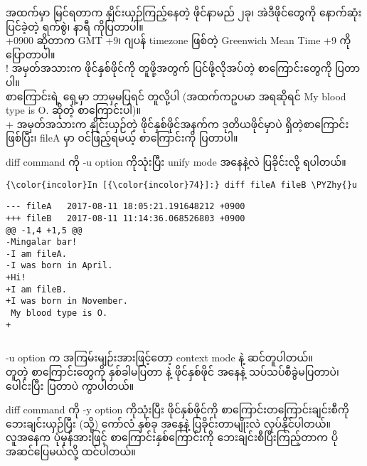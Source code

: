 \documentclass[11pt]{article}
\def\PYZhy{\char`\-}
\begin{document}
    \begin{Verbatim}[commandchars=\\\{\}]

    \end{Verbatim}

    အထက်မှာ မြင်ရတာက နှိုင်းယှဉ်ကြည့်နေတဲ့ ဖိုင်နာမည် ၂ခု၊ အဲဒီဖိုင်တွေကို
နောက်ဆုံး ပြင်ခဲ့တဲ့ ရက်စွဲ၊ နာရီ ကိုပြတာပါ။\\
+0900 ဆိုတာက GMT +9၊ ဂျပန် timezone ဖြစ်တဲ့ Greenwich Mean Time +9
ကိုပြောတာပါ။\\
! အမှတ်အသားက ဖိုင်နှစ်ဖိုင်ကို တူဖို့အတွက် ပြင်ဖို့လိုအပ်တဲ့
စာကြောင်းတွေကို ပြတာပါ။\\
စာကြောင်းရဲ့ ရှေ့မှာ ဘာမှမပြရင် တူလို့ပါ (အထက်ကဥပမာ အရဆိုရင် My blood
type is O. ဆိုတဲ့ စာကြောင်းပါ)။\\
+ အမှတ်အသားက နှိုင်းယှဉ်တဲ့ ဖိုင်နှစ်ဖိုင်အနက်က ဒုတိယဖိုင်မှာပဲ
ရှိတဲ့စာကြောင်းဖြစ်ပြီး၊ fileA မှာ ဝင်ဖြည့်ရမယ့် စာကြောင်းကို ပြတာပါ။

diff command ကို -u option ကိုသုံးပြီး unify mode အနေနဲ့လဲ ပြခိုင်းလို့
ရပါတယ်။

    \begin{Verbatim}[commandchars=\\\{\}]
{\color{incolor}In [{\color{incolor}74}]:} diff fileA fileB \PYZhy{}u
\end{Verbatim}

    \begin{Verbatim}[commandchars=\\\{\}]
--- fileA	2017-08-11 18:05:21.191648212 +0900
+++ fileB	2017-08-11 11:14:36.068526803 +0900
@@ -1,4 +1,5 @@
-Mingalar bar!
-I am fileA.
-I was born in April.
+Hi!
+I am fileB.
+I was born in November.
 My blood type is O.
+

    \end{Verbatim}

    \begin{Verbatim}[commandchars=\\\{\}]

    \end{Verbatim}

    -u option က အကြမ်းမျဉ်းအားဖြင့်တော့ context mode နဲ့ ဆင်တူပါတယ်။\\
တူတဲ့ စာကြောင်းတွေကို နှစ်ခါမပြတာ နဲ့ ဖိုင်နှစ်ဖိုင် အနေနဲ့
သပ်သပ်စီခွဲမပြတာပဲ၊ ပေါင်းပြီး ပြတာပဲ ကွာပါတယ်။

diff command ကို -y option ကိုသုံးပြီး ဖိုင်နှစ်ဖိုင်ကို
စာကြောင်းတကြောင်းချင်းစီကို ဘေးချင်းယှဉ်ပြီး (သို့) ကော်လံ နှစ်ခု အနေနဲ့
ပြခိုင်းတာမျိုးလဲ လုပ်နိုင်ပါတယ်။\\
လူအနေက ပုံမှန်အားဖြင့် စာကြောင်းနှစ်ကြောင်းကို ဘေးချင်းစီပြီးကြည့်တာက
ပိုအဆင်ပြေမယ်လို့ ထင်ပါတယ်။
\end{document}
